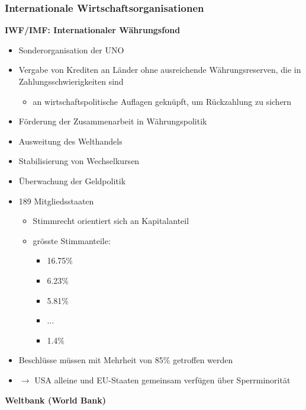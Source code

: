 \subsubsection{Internationale Wirtschaftsorganisationen}
\textbf{IWF/IMF: Internationaler Währungsfond}\\
\begin{itemize}
	\item Sonderorganisation der UNO
	\item Vergabe von Krediten an Länder ohne ausreichende Währungsreserven, die in Zahlungsschwierigkeiten sind
	\begin{itemize}
		\item an wirtschaftspolitische Auflagen geknüpft, um Rückzahlung zu sichern
	\end{itemize}
	\item Förderung der Zusammenarbeit in Währungspolitik
	\item Ausweitung des Welthandels
	\item Stabilisierung von Wechselkursen
	\item Überwachung der Geldpolitik
	\item 189 Mitgliedsstaaten
	\begin{itemize}
		\item Stimmrecht orientiert sich an Kapitalanteil
		\item grösste Stimmanteile:
		\begin{itemize}
			\item{} 16.75\%
			\item{} 6.23\%
			\item{} 5.81\%
			\item{} ...
			\item{} 1.4\%
		\end{itemize}
	\end{itemize}
	\item Beschlüsse müssen mit Mehrheit von 85\% getroffen werden
	\item[\-] $\rightarrow$ USA alleine und EU-Staaten gemeinsam verfügen über Sperrminorität
\end{itemize}
\vspace{\baselineskip}
\textbf{Weltbank (World Bank)}\\
